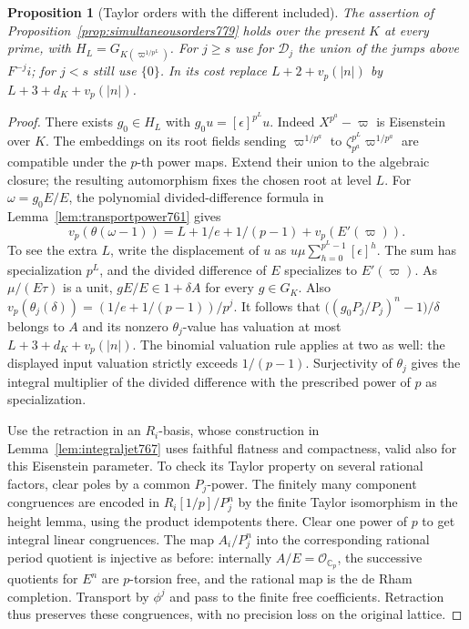 \documentclass[a4paper,11pt]{article}
\newtheorem{proposition}{Proposition}[section]
\theoremstyle{definition}
\theoremstyle{remark}
\numberwithin{equation}{section}
\begin{document}
\begin{proposition}[Taylor orders with the different included]
\leavevmode\label{prop:ramifiedorders782}
The assertion of Proposition~\ref{prop:simultaneousorders779}
holds over the present \(K\) at every prime, with
\(H_L=G_{K(\varpi^{1/p^L})}\). For \(j\ge s\) use for
\(\mathcal D_j\) the union of the jumps above \(F^{-j}i\);
for \(j<s\) still use \(\{0\}\). In its cost replace
\(L+2+v_p(|n|)\) by \(L+3+d_K+v_p(|n|)\).
\end{proposition}
\begin{proof}
There exists \(g_0\in H_L\) with \(g_0u=[\epsilon]^{p^L}u\).
Indeed \(X^{p^a}-\varpi\) is Eisenstein over \(K\).
The embeddings on its root fields sending
\(\varpi^{1/p^a}\) to
\(\zeta_{p^a}^{p^L}\varpi^{1/p^a}\) are compatible under
the \(p\)-th power maps. Extend their union to the
algebraic closure; the resulting automorphism fixes the
chosen root at level \(L\). For \(\omega=g_0E/E\), the
polynomial divided-difference formula in
Lemma~\ref{lem:transportpower761} gives
\[
 v_p(\theta(\omega-1))=
  L+1/e+1/(p-1)+v_p(E'(\varpi)).
\]
To see the extra \(L\), write the displacement of \(u\)
as \(u\mu\sum_{h=0}^{p^L-1}[\epsilon]^h\). The sum has
specialization \(p^L\), and the divided difference of
\(E\) specializes to \(E'(\varpi)\). As
\(\mu/(E\tau)\) is a unit, \(gE/E\in1+\delta A\) for
every \(g\in G_K\). Also
\(v_p(\theta_j(\delta))=(1/e+1/(p-1))/p^j\).
It follows that
\(\big((g_0P_j/P_j)^n-1\big)/\delta\) belongs to \(A\)
and its nonzero \(\theta_j\)-value has valuation at
most \(L+3+d_K+v_p(|n|)\). The binomial valuation rule
applies at two as well: the displayed input valuation
strictly exceeds \(1/(p-1)\). Surjectivity of \(\theta_j\)
gives the integral multiplier of the divided difference
with the prescribed power of \(p\) as specialization.

Use the retraction in an \(R_i\)-basis, whose construction
in Lemma~\ref{lem:integraljet767} uses faithful flatness
and compactness, valid also for this Eisenstein parameter.
To check its Taylor property on several rational factors,
clear poles by a common \(P_j\)-power. The finitely many
component congruences are encoded in \(R_i[1/p]/P_j^n\)
by the finite Taylor isomorphism in the height lemma,
using the product idempotents there. Clear one power of
\(p\) to get integral linear congruences. The map
\(A_i/P_j^n\) into the corresponding rational period
quotient is injective as before: internally
\(A/E=\mathcal O_{\mathbb C_p}\), the successive quotients
for \(E^n\) are \(p\)-torsion free, and the rational map
is the de Rham completion. Transport by \(\phi^j\) and
pass to the finite free coefficients. Retraction thus
preserves these congruences, with no precision loss on
the original lattice.


\end{proof}
\end{document}
